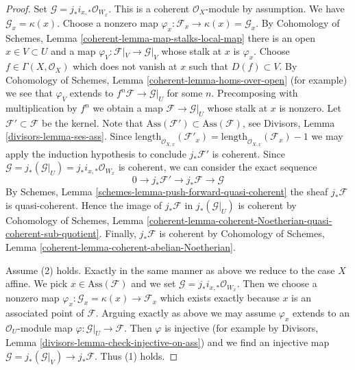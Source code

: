 \begin{proof}
\medskip\noindent
Set $\mathcal{G} = j_*i_{x, *}\mathcal{O}_{W_x}$. This is a coherent
$\mathcal{O}_X$-module by assumption. We have $\mathcal{G}_x = \kappa(x)$.
Choose a nonzero map
$\varphi_x : \mathcal{F}_x \to \kappa(x) = \mathcal{G}_x$.
By Cohomology of Schemes, Lemma \ref{coherent-lemma-map-stalks-local-map}
there is an open $x \in V \subset U$ and a map
$\varphi_V : \mathcal{F}|_V \to \mathcal{G}|_V$ whose stalk
at $x$ is $\varphi_x$. Choose $f \in \Gamma(X, \mathcal{O}_X)$
which does not vanish at $x$ such that $D(f) \subset V$. By
Cohomology of Schemes, Lemma \ref{coherent-lemma-homs-over-open}
(for example) we see that $\varphi_V$ extends to
$f^n\mathcal{F} \to \mathcal{G}|_U$ for some $n$.
Precomposing with multiplication by $f^n$ we obtain a map
$\mathcal{F} \to \mathcal{G}|_U$ whose stalk at $x$ is nonzero.
Let $\mathcal{F}' \subset \mathcal{F}$ be the kernel.
Note that $\text{Ass}(\mathcal{F}') \subset \text{Ass}(\mathcal{F})$, see
Divisors, Lemma \ref{divisors-lemma-ses-ass}.
Since
$\text{length}_{\mathcal{O}_{X, x}}(\mathcal{F}'_x) =
\text{length}_{\mathcal{O}_{X, x}}(\mathcal{F}_x) - 1$
we may apply the
induction hypothesis to conclude $j_*\mathcal{F}'$ is coherent.
Since $\mathcal{G} = j_*(\mathcal{G}|_U) = j_*i_{x, *}\mathcal{O}_{W_x}$
is coherent, we can consider the exact sequence
$$
0 \to j_*\mathcal{F}' \to j_*\mathcal{F} \to \mathcal{G}
$$
By Schemes, Lemma \ref{schemes-lemma-push-forward-quasi-coherent}
the sheaf $j_*\mathcal{F}$ is quasi-coherent.
Hence the image of $j_*\mathcal{F}$ in $j_*(\mathcal{G}|_U)$
is coherent by Cohomology of Schemes, Lemma
\ref{coherent-lemma-coherent-Noetherian-quasi-coherent-sub-quotient}.
Finally, $j_*\mathcal{F}$ is coherent by
Cohomology of Schemes, Lemma \ref{coherent-lemma-coherent-abelian-Noetherian}.

\medskip\noindent
Assume (2) holds. Exactly in the same manner as above we reduce
to the case $X$ affine. We pick $x \in \text{Ass}(\mathcal{F})$
and we set $\mathcal{G} = j_*i_{x, *}\mathcal{O}_{W_x}$.
Then we choose a nonzero map
$\varphi_x : \mathcal{G}_x = \kappa(x) \to \mathcal{F}_x$
which exists exactly because $x$ is an associated point of $\mathcal{F}$.
Arguing exactly as above we may assume $\varphi_x$
extends to an $\mathcal{O}_U$-module map
$\varphi : \mathcal{G}|_U \to \mathcal{F}$.
Then $\varphi$ is injective (for example by
Divisors, Lemma \ref{divisors-lemma-check-injective-on-ass})
and we find an injective map
$\mathcal{G} = j_*(\mathcal{G}|_V) \to j_*\mathcal{F}$.
Thus (1) holds.
\end{proof}